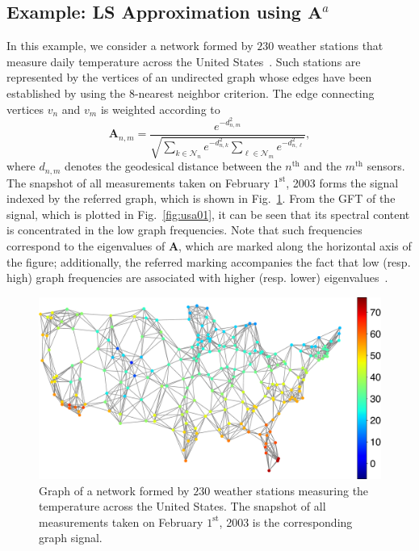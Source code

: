 \subsection{Example: LS Approximation using $\mathbf{A}^{{a}}$}\label{subsec:lsi01}
In this example, we consider a network formed by $230$ weather stations that measure daily temperature across the United States~\cite{data2011}. Such stations are represented by the vertices of an undirected graph whose edges have been established by using the $8$-nearest neighbor criterion.  The edge connecting vertices $v_n$ and $v_m$ is weighted according to
\begin{equation}
    \mathbf{A}_{n,m}=\frac{e^{-d^2_{n,m}}}{\sqrt{\sum_{k\in\mathcal{N}_n}e^{-d^2_{n,k}}\sum_{\ell\in\mathcal{N}_m}e^{-d^2_{n,\ell}}}},
\end{equation}
where $d_{n,m}$ denotes the geodesical distance between the $n^{\text{th}}$ and the $m^{\text{th}}$ sensors. The snapshot of all measurements taken on February $1^{\text{st}}$, 2003 forms the signal indexed by the referred graph, which is shown in Fig.~\ref{fig:usa00}. From the GFT of the signal, which is plotted in Fig.~\ref{fig:usa01}, it can be seen that its spectral content is concentrated in the low graph frequencies. Note that such frequencies correspond to the eigenvalues of $\mathbf{A}$, which are marked along the horizontal axis of the figure; additionally, the referred marking accompanies the fact that low (resp. high) graph frequencies are associated with higher (resp. lower) eigenvalues~\cite{sandryhaila2014frequency}.

\begin{figure}%
\centering
\includegraphics[width=0.6\linewidth]{Figures/GNorm_estacoes_temperatura.pdf}
\caption{Graph of a network formed by $230$ weather stations measuring the temperature across the United States. The snapshot of all measurements taken on February $1^{\text{st}}$, 2003 is the corresponding graph signal.}%
\label{fig:usa00}%
\vspace{0.14cm}
\end{figure}

